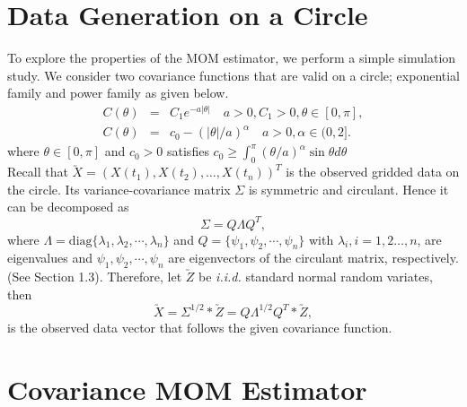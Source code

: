 \section{Data Generation on a Circle}

To explore the properties of the MOM estimator, we perform a simple simulation study. We consider two covariance functions that are valid on a circle; exponential family and power family as given below.
\begin{eqnarray}
\label{exp_cov}
C(\theta) &=& C_1e^{-a|\theta|} \quad a>0, C_1>0, \theta \in [0, \pi], \\
\label{power_cov}
C(\theta) &=& c_0 - (|\theta|/a)^{\alpha} \quad a>0, \alpha \in (0,2].
\end{eqnarray}
\noindent where $\theta \in [0,\pi]$ and  $c_0 > 0$ satisfies $c_0 \ge \int_0^\pi(\theta/a)^{\alpha} \sin \theta d \theta$ \\


Recall that $\utilde{X} = (X(t_1), X(t_2), \ldots, X(t_n))^T$ is the observed gridded data on the circle. Its variance-covariance matrix $\Sigma$ is symmetric and circulant. Hence it can be 
decomposed as
\[
\Sigma = Q \Lambda Q^T,
\]
where $\Lambda=\mbox{diag}\{\lambda_1, \lambda_2,\cdots,\lambda_n\}$ and $Q=\{\psi_1, \psi_2,\cdots,\psi_n\}$ with $\lambda_i, i = 1, 2 \ldots, n$, are eigenvalues and $\psi_1, \psi_2,\cdots,\psi_n$ are eigenvectors of the circulant matrix, respectively. (See Section 1.3). Therefore, let $\utilde{Z}$ be {\em i.i.d.} standard normal random variates, then
\[
	\utilde{X} = \Sigma^{1/2}*\utilde{Z} = Q\Lambda^{1/2}Q^T*\utilde{Z},
\]
\noi is the observed data vector that follows the given covariance function.

\section{Covariance MOM Estimator}


